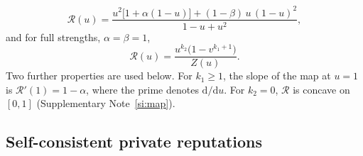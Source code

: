 \documentclass[10pt]{wlscirep}
\newcommand{\Rmap}{\mathscr{R}}            %
\newcommand{\dd}{\mathrm{d}}
\theoremstyle{plain}
\theoremstyle{remark}
\begin{document}
\begin{equation}
\Rmap(u)=\frac{u^2\bigl[1+\alpha(1-u)\bigr]+(1-\beta)\,u\,(1-u)^2}{1-u+u^2},
\label{eq:m-onestep}
\end{equation}
and for full strengths, $\alpha=\beta=1$,
\begin{equation}
\Rmap(u)=\frac{u^{k_2}\bigl(1-v^{k_1+1}\bigr)}{Z(u)}.
\label{eq:m-full}
\end{equation}
Two further properties are used below. For $k_1\geq1$, the slope of the map at $u=1$ is $\Rmap'(1)=1-\alpha$, where the prime denotes $\dd/\dd u$. For $k_2=0$, $\Rmap$ is concave on $[0,1]$ (Supplementary Note~\ref{si:map}).

\subsection*{Self-consistent private reputations}
\end{document}
